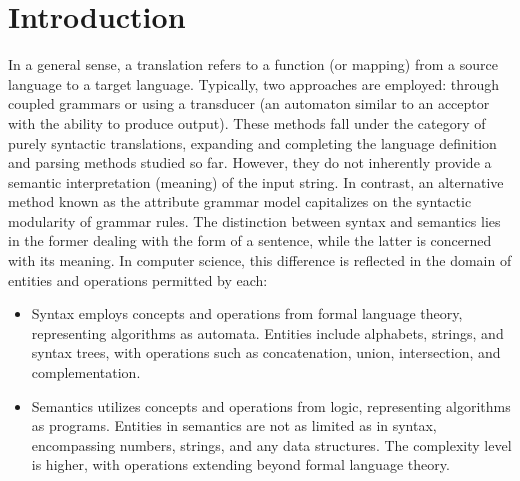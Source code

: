 \section{Introduction}

In a general sense, a translation refers to a function (or mapping) from a source language to a target language. 
Typically, two approaches are employed: through coupled grammars or using a transducer (an automaton similar to an acceptor with the ability to produce output).
These methods fall under the category of purely syntactic translations, expanding and completing the language definition and parsing methods studied so far. 
However, they do not inherently provide a semantic interpretation (meaning) of the input string. 
In contrast, an alternative method known as the attribute grammar model capitalizes on the syntactic modularity of grammar rules.
The distinction between syntax and semantics lies in the former dealing with the form of a sentence, while the latter is concerned with its meaning. 
In computer science, this difference is reflected in the domain of entities and operations permitted by each:
\begin{itemize}
  \item Syntax employs concepts and operations from formal language theory, representing algorithms as automata. 
    Entities include alphabets, strings, and syntax trees, with operations such as concatenation, union, intersection, and complementation.
  \item Semantics utilizes concepts and operations from logic, representing algorithms as programs. 
    Entities in semantics are not as limited as in syntax, encompassing numbers, strings, and any data structures. The complexity level is higher, with operations extending beyond formal language theory.
\end{itemize}